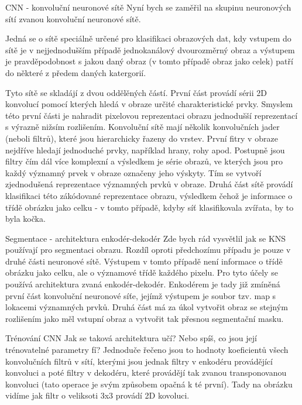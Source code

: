 \documentclass[aspectratio=1610]{beamer}
\begin{document}
\begin{frame}{CNN - konvoluční neuronové sítě}
Nyní bych se zaměřil na skupinu neuronových sítí zvanou konvoluční neuronové sítě. 

Jedná se o sítě speciálně určené pro klasifikaci obrazových dat, kdy vstupem do sítě je v nejjednodušším případě jednokanálový dvourozměrný obraz a výstupem je pravděpodobnost s jakou daný obraz (v tomto případě obraz jako celek) patří do některé z předem daných katergorií.

Tyto sítě se skladájí z dvou oddělěných částí. První část provádí sérii 2D konvolucí pomocí kterých hledá v obraze určité charakteristické prvky. Smyslem této první části je nahradit pixelovou reprezentaci obrazu jednodušší reprezentací s výrazně nižsím rozlišením. Konvoluční sítě mají několik konvolučních jader (neboli filtrů), které jsou hierarchicky řazeny do vrstev. První fitry v obraze nejdříve hledají jednoduché prvky, například hrany, rohy apod. Postupně jsou filtry čím dál více komplexní a výsledkem je série obrazů, ve kterých jsou pro každý významný prvek v obraze označeny jeho výskyty. Tím se vytvoří zjednodušená reprezentace významných prvků v obraze. Druhá část sítě provádí klasifikaci této zákódované reprezentace obrazu, výsledkem čehož je informace o třídě obrázku jako celku - v tomto případě, kdyby síť klasifikovala zvířata, by to byla kočka.
\end{frame}
\begin{frame}{Segmentace - architektura enkodér-dekodér}
Zde bych rád vysvětlil jak se KNS používají pro segmentaci obrazu. Rozdíl oproti předchozímu případu je pouze v druhé části neuronové sítě. Výstupem v tomto případě není informace o třídě obrázku jako celku, ale o významové třídě každého pixelu. Pro tyto účely se používá architektura zvaná enkodér-dekodér. Enkodérem je tady již zmíněná první část konvoluční neuronové síťe, jejímž výstupem je soubor tzv. map s lokacemi významných prvků. Druhá část má za úkol vytvořit obraz se stejným rozlišením jako měl vstupní obraz a vytvořit tak přesnou segmentační masku. 
\end{frame}
\begin{frame}{Trénování CNN}
Jak se taková architektura učí? Nebo spíš, co jsou její trénovatelné parametry fí? Jednoduče řečeno jsou to hodnoty koeficientů všech konvolučních filtrů v sítí, kterými jsou jednak filtry v enkodéru provádějící konvoluci a poté filtry v dekodéru, které provádějí tak zvanou transponovanou konvoluci (tato operace je svým způsobem opačná k té první). Tady na obrázku vidíme jak filtr o veliksoti 3x3 provádí 2D kovoluci.
\end{frame}
\end{document}
